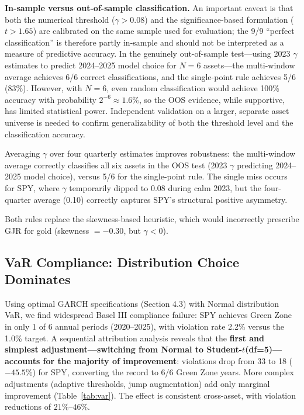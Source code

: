 \textbf{In-sample versus out-of-sample classification.} An important caveat is that both the numerical threshold ($\gamma > 0.08$) and the significance-based formulation ($t > 1.65$) are calibrated on the same sample used for evaluation; the 9/9 ``perfect classification'' is therefore partly in-sample and should not be interpreted as a measure of predictive accuracy. In the genuinely out-of-sample test---using 2023 $\gamma$ estimates to predict 2024--2025 model choice for $N = 6$ assets---the multi-window average achieves 6/6 correct classifications, and the single-point rule achieves 5/6 (83\%). However, with $N = 6$, even random classification would achieve 100\% accuracy with probability $2^{-6} \approx 1.6\%$, so the OOS evidence, while supportive, has limited statistical power. Independent validation on a larger, separate asset universe is needed to confirm generalizability of both the threshold level and the classification accuracy.

Averaging $\gamma$ over four quarterly estimates improves robustness: the multi-window average correctly classifies all six assets in the OOS test (2023 $\gamma$ predicting 2024--2025 model choice), versus 5/6 for the single-point rule. The single miss occurs for SPY, where $\gamma$ temporarily dipped to 0.08 during calm 2023, but the four-quarter average (0.10) correctly captures SPY's structural positive asymmetry.

Both rules replace the skewness-based heuristic, which would incorrectly prescribe GJR for gold (skewness $= -0.30$, but $\gamma < 0$).


\subsection{VaR Compliance: Distribution Choice Dominates}

Using optimal GARCH specifications (Section 4.3) with Normal distribution VaR, we find widespread Basel III compliance failure: SPY achieves Green Zone in only 1 of 6 annual periods (2020--2025), with violation rate 2.2\% versus the 1.0\% target. A sequential attribution analysis reveals that the \textbf{first and simplest adjustment---switching from Normal to Student-$t$(df=5)---accounts for the majority of improvement}: violations drop from 33 to 18 ($-45.5\%$) for SPY, converting the record to 6/6 Green Zone years. More complex adjustments (adaptive thresholds, jump augmentation) add only marginal improvement (Table~\ref{tab:var}). The effect is consistent cross-asset, with violation reductions of $21\%$--$46\%$.

